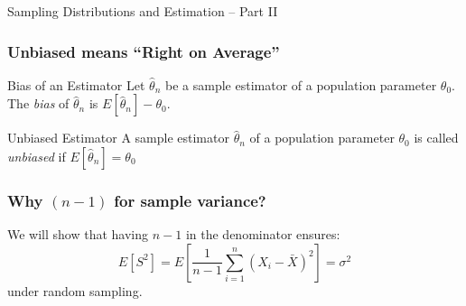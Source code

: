 \documentclass[handout]{beamer}
\date{Lecture \# 15}
\begin{document}
 


\begin{frame}[plain]
	\titlepage 
	

\end{frame} 


\begin{frame}
\begin{center}
\Huge Sampling Distributions and Estimation -- Part II
\end{center}
\end{frame}


\begin{frame}
\frametitle{Unbiased means ``Right on Average''}

\begin{block}{Bias of an Estimator}
Let $\widehat{\theta}_n$ be a sample estimator of a population parameter $\theta_0$. The \emph{bias} of $\widehat{\theta}_n$ is $E[\widehat{\theta}_n] - \theta_0$.
\end{block}

\begin{block}{Unbiased Estimator}
A sample estimator $\widehat{\theta}_n$ of a population parameter $\theta_0$ is called \emph{unbiased} if $E[\widehat{\theta}_n]= \theta_0$
\end{block}

\end{frame}



\begin{frame}
\frametitle{Why $(n-1)$ for sample variance?}
\alert{We will show that having $n-1$ in the denominator ensures:}
$$E[S^2] =E\left[ \frac{1}{n-1} \sum_{i=1}^n \left(X_i - \bar{X}\right)^2\right] = \sigma^2$$
\alert{under random sampling.}
\end{frame}


\end{document}
